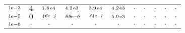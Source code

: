\begin{tiny}
\begin{tabular}{@{$\;$}c@{$\;$}|@{$\;$}c@{$\;$}@{$\;$}c@{$\;$}@{$\;$}c@{$\;$}@{$\;$}c@{$\;$}@{$\;$}c@{$\;$}|@{$\;$}c@{$\;$}@{$\;$}c@{$\;$}@{$\;$}c@{$\;$}@{$\;$}c@{$\;$}@{$\;$}c@{$\;$}}
$\scriptstyle1\!\mathrm{\hspace{0.10em}e}-3$ & $\scriptstyle4$ & $\scriptstyle1.8\mathrm{\hspace{0.10em}e}4$ & $\scriptstyle4.2\mathrm{\hspace{0.10em}e}3$ & $\scriptstyle3.9\mathrm{\hspace{0.10em}e}4$ & $\scriptstyle4.2\mathrm{\hspace{0.10em}e}3$ & $\scriptstyle.$ & $\scriptstyle.$ & $\scriptstyle.$ & $\scriptstyle.$ & $\scriptstyle.$\\ 
$\scriptstyle1\!\mathrm{\hspace{0.10em}e}-5$ & $\scriptstyle0$ & $\scriptstyle\textit{46}\hspace{0.00em}e\textit{--4}$ & $\scriptstyle\textit{89}\hspace{0.00em}e\textit{--6}$ & $\scriptstyle\textit{34}\hspace{0.00em}e\textit{--1}$ & $\scriptstyle5.0\mathrm{\hspace{0.10em}e}3$ & $\scriptstyle.$ & $\scriptstyle.$ & $\scriptstyle.$ & $\scriptstyle.$ & $\scriptstyle.$\\ 
$\scriptstyle1\!\mathrm{\hspace{0.10em}e}-8$ & $\scriptstyle.$ & $\scriptstyle.$ & $\scriptstyle.$ & $\scriptstyle.$ & $\scriptstyle.$ & $\scriptstyle.$ & $\scriptstyle.$ & $\scriptstyle.$ & $\scriptstyle.$ & $\scriptstyle.$\\ 
\end{tabular} 
\end{tiny} 
